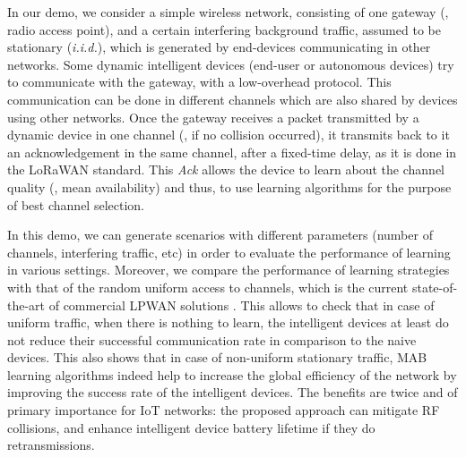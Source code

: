 In our demo, we consider a simple wireless network, consisting of one gateway (\ie, radio access point), and a certain interfering background traffic, assumed to be stationary (\emph{i.i.d.}), which is generated by end-devices communicating in other networks.
Some dynamic intelligent devices (end-user or autonomous devices) try to communicate with the gateway, with a low-overhead protocol. This communication can be done in different channels which are also shared by devices using other networks.
Once the gateway receives a packet transmitted by a dynamic device in one channel (\ie, if no collision occurred), it transmits back to it an acknowledgement in the same channel, after a fixed-time delay, as it is done in the LoRaWAN standard.
This \emph{Ack} allows the device to learn about the channel quality (\ie, mean availability) and thus, to use learning algorithms for the purpose of best channel selection.

In this demo, we can generate scenarios with different parameters (number of channels, interfering traffic, etc) in order to evaluate the performance of learning in various settings.
Moreover, we compare the performance of learning strategies with that of the random uniform access to channels, which is the current state-of-the-art of commercial LPWAN solutions \cite{Raza17}.
%
This allows to check that in case of uniform traffic, when there is nothing to learn, the intelligent devices at least do not reduce their successful communication rate in comparison to the naive devices.
This also shows that in case of non-uniform stationary traffic, MAB learning algorithms indeed help to increase the global efficiency of the network by improving the success rate of the intelligent devices.
%
The benefits are twice and of primary importance for IoT networks:
the proposed approach can mitigate RF collisions,
and enhance intelligent device battery lifetime if they do retransmissions.




